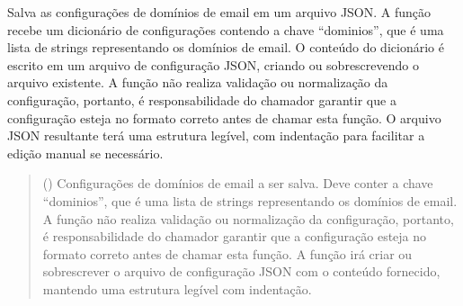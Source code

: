 \documentclass[letterpaper,10pt,english]{sphinxmanual}
\begin{document}
\begin{fulllineitems}
\label{\detokenize{api/config:config.save_email_domains_config}}
\pysigstartsignatures
\pysiglinewithargsret
{}
{}
{}
\pysigstopsignatures
\sphinxAtStartPar
Salva as configurações de domínios de email em um arquivo JSON. A função recebe um dicionário de configurações contendo a chave “dominios”, que é uma lista de strings representando os domínios de email. O conteúdo do dicionário é escrito em um arquivo de configuração JSON, criando ou sobrescrevendo o arquivo existente. A função não realiza validação ou normalização da configuração, portanto, é responsabilidade do chamador garantir que a configuração esteja no formato correto antes de chamar esta função. O arquivo JSON resultante terá uma estrutura legível, com indentação para facilitar a edição manual se necessário.
\begin{quote}\begin{description}
\sphinxAtStartPar
{} () \textendash{} Configurações de domínios de email a ser salva. Deve conter a chave “dominios”, que é uma lista de strings representando os domínios de email. A função não realiza validação ou normalização da configuração, portanto, é responsabilidade do chamador garantir que a configuração esteja no formato correto antes de chamar esta função. A função irá criar ou sobrescrever o arquivo de configuração JSON com o conteúdo fornecido, mantendo uma estrutura legível com indentação.

\sphinxAtStartPar
{}

\end{description}\end{quote}

\end{fulllineitems}

\end{document}
